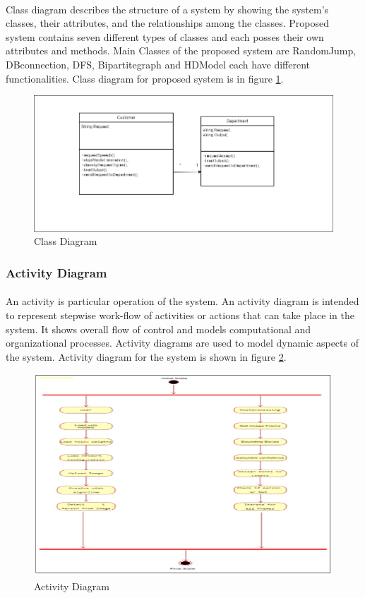 \paragraph{}Class diagram describes the structure of a system by showing the system's classes, their attributes, and the relationships among the classes. Proposed system contains seven different types of classes and each posses their own attributes and methods. Main Classes of the proposed system are RandomJump, DBconnection, DFS, Bipartitegraph and HDModel each have different functionalities. Class diagram for proposed system is in figure \ref{fig:Class}.
\begin{figure}[!h]
\centering
\includegraphics[width=1.0\linewidth]{./Class}
\caption[Class Diagram]{Class Diagram}
\label{fig:Class}
\end{figure}
\newpage
\subsubsection{Activity Diagram}
\paragraph{}An activity is particular operation of the system. An activity diagram is intended to represent stepwise work-flow of activities or actions that can take place in the system. It shows overall flow of control and models computational and organizational processes. Activity diagrams are used to model dynamic aspects of the system. Activity diagram for the system is shown in figure \ref{fig:Activity}.
\begin{figure}[!h]
\centering
\includegraphics[width=1.1\linewidth]{./act}
\caption{Activity Diagram}
\label{fig:Activity}
\end{figure}
\newpage
